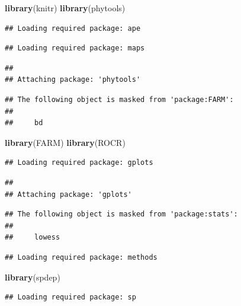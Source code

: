 \documentclass[]{book}
\newenvironment{Shaded}{\begin{snugshade}}{\end{snugshade}}
\newcommand{\KeywordTok}[1]{\textcolor[rgb]{0.13,0.29,0.53}{\textbf{{#1}}}}
\newcommand{\NormalTok}[1]{{#1}}
\theoremstyle{definition}
\theoremstyle{definition}
\theoremstyle{remark}
\begin{document}
\begin{Shaded}
\begin{Highlighting}[]
\KeywordTok{library}\NormalTok{(knitr)}
\KeywordTok{library}\NormalTok{(phytools)}
\end{Highlighting}
\end{Shaded}

\begin{verbatim}
## Loading required package: ape
\end{verbatim}

\begin{verbatim}
## Loading required package: maps
\end{verbatim}

\begin{verbatim}
## 
## Attaching package: 'phytools'
\end{verbatim}

\begin{verbatim}
## The following object is masked from 'package:FARM':
## 
##     bd
\end{verbatim}

\begin{Shaded}
\begin{Highlighting}[]
\KeywordTok{library}\NormalTok{(FARM)}
\KeywordTok{library}\NormalTok{(ROCR)}
\end{Highlighting}
\end{Shaded}

\begin{verbatim}
## Loading required package: gplots
\end{verbatim}

\begin{verbatim}
## 
## Attaching package: 'gplots'
\end{verbatim}

\begin{verbatim}
## The following object is masked from 'package:stats':
## 
##     lowess
\end{verbatim}

\begin{verbatim}
## Loading required package: methods
\end{verbatim}

\begin{Shaded}
\begin{Highlighting}[]
\KeywordTok{library}\NormalTok{(spdep)}
\end{Highlighting}
\end{Shaded}

\begin{verbatim}
## Loading required package: sp
\end{verbatim}
\end{document}
